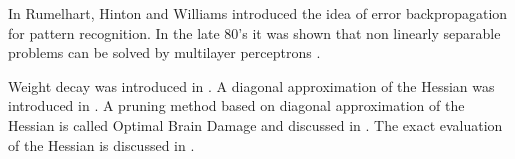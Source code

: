 In \cite{RumelhartHintonWilliams:1986} Rumelhart, Hinton and Williams introduced the idea of error backpropagation for pattern recognition. In the late 80's it was shown that non linearly separable problems can be solved by multilayer perceptrons \cite{HornikStinchcombeWhite:1989}.

Weight decay was introduced in \cite{Hinton:1986}. A diagonal approximation of the Hessian was introduced in \cite{LeCun:1987}. A pruning method based on diagonal approximation of the Hessian is called Optimal Brain Damage and discussed in \cite{LeCunDenkerSolla:1990}. The exact evaluation of the Hessian is discussed in \cite{Bishop:1992}.